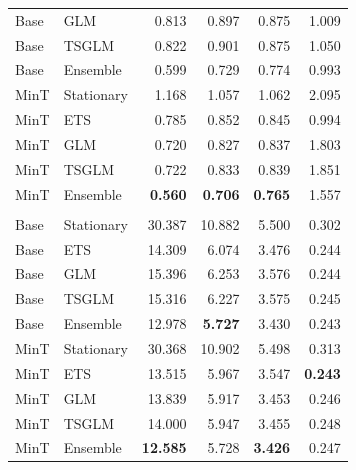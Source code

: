 \documentclass[
  authoryear,
  preprint,
  3p]{elsarticle}
\begin{document}
\begin{table}
{\begin{tabular}{llrrrr}
\hspace{1em}Base & GLM & 0.813 & 0.897 & 0.875 & 1.009\\
\hspace{1em}Base & TSGLM & 0.822 & 0.901 & 0.875 & 1.050\\
\hspace{1em}Base & Ensemble & 0.599 & 0.729 & 0.774 & 0.993\\
\hspace{1em}MinT & Stationary & 1.168 & 1.057 & 1.062 & 2.095\\
\hspace{1em}MinT & ETS & 0.785 & 0.852 & 0.845 & 0.994\\
\hspace{1em}MinT & GLM & 0.720 & 0.827 & 0.837 & 1.803\\
\hspace{1em}MinT & TSGLM & 0.722 & 0.833 & 0.839 & 1.851\\
\hspace{1em}MinT & Ensemble & \textbf{0.560} & \textbf{0.706} & \textbf{0.765} & 1.557\\
\addlinespace[0.3em]
\hline
\multicolumn{6}{l}{\textbf{CRPS}}\\
\hspace{1em}Base & Stationary & 30.387 & 10.882 & 5.500 & 0.302\\
\hspace{1em}Base & ETS & 14.309 & 6.074 & 3.476 & 0.244\\
\hspace{1em}Base & GLM & 15.396 & 6.253 & 3.576 & 0.244\\
\hspace{1em}Base & TSGLM & 15.316 & 6.227 & 3.575 & 0.245\\
\hspace{1em}Base & Ensemble & 12.978 & \textbf{5.727} & 3.430 & 0.243\\
\hspace{1em}MinT & Stationary & 30.368 & 10.902 & 5.498 & 0.313\\
\hspace{1em}MinT & ETS & 13.515 & 5.967 & 3.547 & \textbf{0.243}\\
\hspace{1em}MinT & GLM & 13.839 & 5.917 & 3.453 & 0.246\\
\hspace{1em}MinT & TSGLM & 14.000 & 5.947 & 3.455 & 0.248\\
\hspace{1em}MinT & Ensemble & \textbf{12.585} & 5.728 & \textbf{3.426} & 0.247\\
\bottomrule
\end{tabular}

}

\end{table}%
\end{document}
